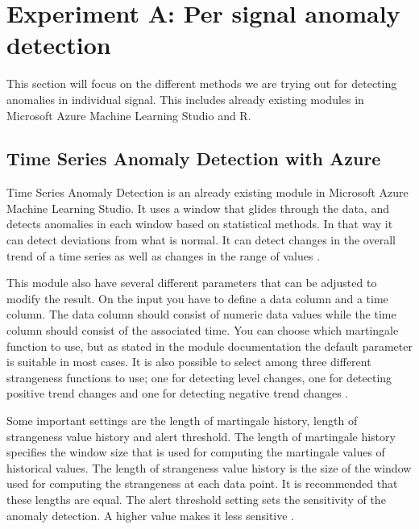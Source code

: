 \documentclass[english, a4paper]{report}
\begin{document}
{    \section{Experiment A: Per signal anomaly detection} \label{prSignalAD}
    {
        This section will focus on the different methods we are trying out for detecting anomalies in individual signal. This includes already existing modules in Microsoft Azure Machine Learning Studio and R.
        
        \subsection{Time Series Anomaly Detection with Azure} \label{timeSeriesAD}
        {
            Time Series Anomaly Detection is an already existing module in Microsoft Azure Machine Learning Studio. It uses a window that glides through the data, and detects anomalies in each window based on statistical methods. In that way it can detect deviations from what is normal. It can detect changes in the overall trend of a time series as well as changes in the range of values \cite{azureTimeSeriesAD}. 
            \par
            
            This module also have several different parameters that can be adjusted to modify the result. On the input you have to define a data column and a time column. The data column should consist of numeric data values while the time column should consist of the associated time. You can choose which martingale function to use, but as stated in the module documentation the default parameter is suitable in most cases. It is also possible to select among three different strangeness functions to use; one for detecting level changes, one for detecting positive trend changes and one for detecting negative trend changes \cite{azureTimeSeriesAD}. 
            \par
            
            Some important settings are the length of martingale history, length of strangeness value history and alert threshold. The length of martingale history specifies the window size that is used for computing the martingale values of historical values. The length of strangeness value history is the size of the window used for computing the strangeness at each data point. It is recommended that these lengths are equal. The alert threshold setting sets the sensitivity of the anomaly detection. A higher value makes it less sensitive \cite{azureTimeSeriesAD}. 
            \par
            
}}}
\end{document}
